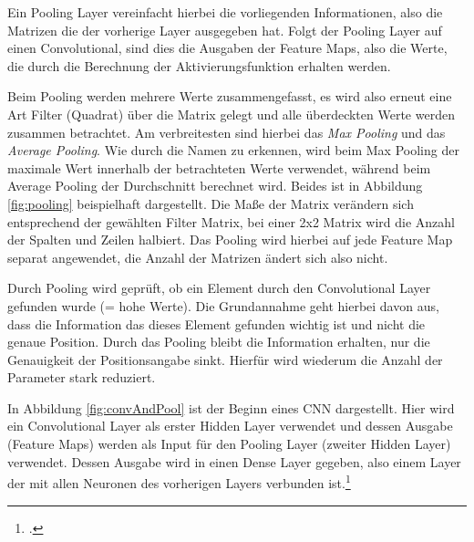 Ein Pooling Layer vereinfacht hierbei die vorliegenden Informationen, also die Matrizen die der vorherige Layer ausgegeben hat. Folgt der Pooling Layer auf einen Convolutional, sind dies die Ausgaben der Feature Maps, also die Werte, die durch die Berechnung der Aktivierungsfunktion erhalten werden.

Beim Pooling werden mehrere Werte zusammengefasst, es wird also erneut eine Art Filter (Quadrat) über die Matrix gelegt und alle überdeckten Werte werden zusammen betrachtet. Am verbreitesten sind hierbei das \textit{Max Pooling} und das \textit{Average Pooling}. Wie durch die Namen zu erkennen, wird beim Max Pooling der maximale Wert innerhalb der betrachteten Werte verwendet, während beim Average Pooling der Durchschnitt berechnet wird. Beides ist in Abbildung \ref{fig:pooling} beispielhaft dargestellt. Die Maße der Matrix verändern sich entsprechend der gewählten Filter Matrix, bei einer 2x2 Matrix wird die Anzahl der Spalten und Zeilen halbiert.
Das Pooling wird hierbei auf jede Feature Map separat angewendet, die Anzahl der Matrizen ändert sich also nicht. 

Durch Pooling wird geprüft, ob ein Element durch den Convolutional Layer gefunden wurde (= hohe Werte). Die Grundannahme geht hierbei davon aus, dass die Information das dieses Element gefunden wichtig ist und nicht die genaue Position. Durch das Pooling bleibt die Information erhalten, nur die Genauigkeit der Positionsangabe sinkt. Hierfür wird wiederum die Anzahl der Parameter stark reduziert. 

In Abbildung \ref{fig:convAndPool} ist der Beginn eines \ac{CNN} dargestellt. Hier wird ein Convolutional Layer als erster Hidden Layer verwendet und dessen Ausgabe (Feature Maps) werden als Input für den Pooling Layer (zweiter Hidden Layer) verwendet. Dessen Ausgabe wird in einen Dense Layer gegeben, also einem Layer der mit allen Neuronen des vorherigen Layers verbunden ist.\footcite[Vgl.][S. 169-171]{nielsenNeuralNetworksDeep2015}

